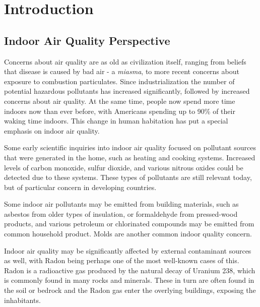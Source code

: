 \documentclass[../thesis.tex]{subfiles}
\begin{document}
\chapter{Introduction}


\section{Indoor Air Quality Perspective}

Concerns about air quality are as old as civilization itself, ranging from beliefs that disease is caused by bad air - a \textit{miasma}, to more recent concerns about exposure to combustion particulates.
Since industrialization the number of potential hazardous pollutants has increased significantly, followed by increased concerns about air quality.
At the same time, people now spend more time indoors now than ever before, with Americans spending up to 90\% of their waking time indoors\cite{klepeis_national_2001}.
This change in human habitation has put a special emphasis on indoor air quality.

Some early scientific inquiries into indoor air quality focused on pollutant sources that were generated in the home, such as heating and cooking systems.
Increased levels of carbon monoxide, sulfur dioxide, and various nitrous oxides could be detected due to these systems\cite{craig_d._hollowell_combustion-generated_1976}.
These types of pollutants are still relevant today, but of particular concern in developing countries\cite{world_health_organisation_who_2014}.

Some indoor air pollutants may be emitted from building materials, such as asbestos from older types of insulation, or formaldehyde from pressed-wood products, and various petroleum or chlorinated compounds may be emitted from common household product. %
Molds are another common indoor quality concern\cite{world_health_organisation_who_2009}.

Indoor air quality may be significantly affected by external contaminant sources as well, with Radon being perhaps one of the most well-known cases of this.
Radon is a radioactive gas produced by the natural decay of Uranium 238, which is commonly found in many rocks and minerals.
These in turn are often found in the soil or bedrock and the Radon gas enter the overlying buildings, exposing the inhabitants.
\end{document}
